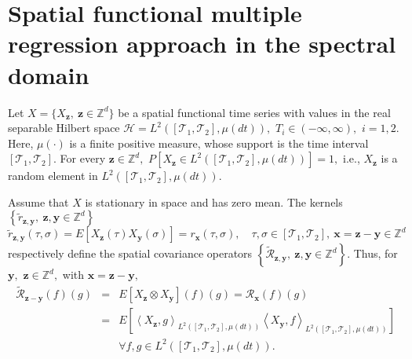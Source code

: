 \documentclass[11pt,a4paper]{article}
\begin{document}
\section{Spatial  functional multiple regression approach in the spectral domain}

Let  $X=\{X_{\mathbf{z}},\ \mathbf{z}\in \mathbb{Z}^{d}\}$ be a spatial functional time series  with values in the real separable Hilbert space $\mathcal{H}=L^{2}\left([\mathcal{T}_{1},\mathcal{T}_{2}],\mu (dt)\right),$  $T_{i}\in (-\infty,\infty),$ $i=1,2.$ Here, $\mu (\cdot)$ is a finite positive  measure, whose support is the time interval $[\mathcal{T}_{1},\mathcal{T}_{2}].$ For every $\mathbf{z}\in \mathbb{Z}^{d},$ $P\left[ X_{\mathbf{z}}\in L^{2}\left([\mathcal{T}_{1},\mathcal{T}_{2}],\mu (dt)\right)\right]=1,$ i.e., $X_{\mathbf{z}}$ is a random element in  $L^{2}\left([\mathcal{T}_{1},\mathcal{T}_{2}],\mu (dt)\right).$

 Assume that $X$ is stationary in space and has zero mean. The  kernels $\left\{\widetilde{r}_{\mathbf{z},\mathbf{y}},\
 \mathbf{z},\mathbf{y}\in \mathbb{Z}^{d}\right\}$
\begin{equation*}
\widetilde{r}_{\mathbf{z},\mathbf{y}}(\tau,\sigma)= E\left[X_{\mathbf{z}}(\tau)X_{\mathbf{y}}(\sigma)\right]=  r_{\mathbf{x}}(\tau,\sigma), \quad \tau,\sigma\in [\mathcal{T}_{1},\mathcal{T}_{2}], \ \mathbf{x}=\mathbf{z}-\mathbf{y}\in \mathbb{Z}^{d}
\end{equation*}
\noindent respectively define the spatial covariance operators  $\left\{ \widetilde{\mathcal{R}}_{\mathbf{z},\mathbf{y}},\ \mathbf{z},\mathbf{y}\in \mathbb{Z}^{d}\right\}.$   Thus, for $\mathbf{y},$ $\mathbf{z}\in \mathbb{Z}^{d},$ with $\mathbf{x}=\mathbf{z}-\mathbf{y},$
\begin{eqnarray}
\widetilde{\mathcal{R}}_{\mathbf{z}-\mathbf{y}}(f)(g)&=&E\left[X_{\mathbf{z}}\otimes X_{\mathbf{y}}\right](f)(g)=\mathcal{R}_{\mathbf{x}}(f)(g)\nonumber\\
&=&E\left[\left\langle X_{\mathbf{z}},g \right\rangle_{L^{2}\left([\mathcal{T}_{1},\mathcal{T}_{2}],\mu (dt)\right)} \left\langle X_{\mathbf{y}},f \right\rangle_{L^{2}\left([\mathcal{T}_{1},\mathcal{T}_{2}],\mu (dt)\right)}\right]\nonumber\\ && \forall f,g \in L^{2}\left([\mathcal{T}_{1},\mathcal{T}_{2}],\mu (dt)\right).\label{oce}\end{eqnarray}
\end{document}

